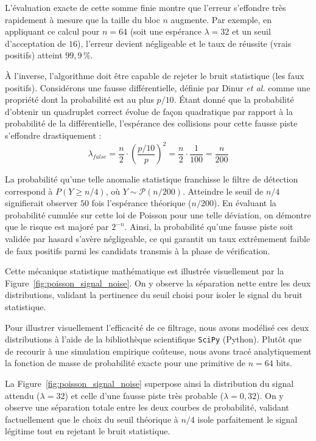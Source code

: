\documentclass[a4paper,11pt]{article}
\begin{document}
L'évaluation exacte de cette somme finie montre que l'erreur s'effondre très rapidement à mesure que la taille du bloc $n$ augmente. Par exemple, en appliquant ce calcul pour $n=64$ (soit une espérance $\lambda = 32$ et un seuil d'acceptation de $16$), l'erreur devient négligeable et le taux de réussite (vrais positifs) atteint $99,9\,\%$. 

À l'inverse, l'algorithme doit être capable de rejeter le bruit statistique (les faux positifs). Considérons une fausse différentielle, définie par Dinur \textit{et al.} \cite{DDKRS23} comme une propriété dont la probabilité est au plus $p/10$. Étant donné que la probabilité d'obtenir un quadruplet correct évolue de façon quadratique par rapport à la probabilité de la différentielle, l'espérance des collisions pour cette fausse piste s'effondre drastiquement :
\begin{equation*}
    \lambda_{false} = \frac{n}{2} \cdot \left(\frac{p/10}{p}\right)^2 = \frac{n}{2} \cdot \frac{1}{100} = \frac{n}{200}
\end{equation*}

La probabilité qu'une telle anomalie statistique franchisse le filtre de détection correspond à $P(Y \ge n/4)$, où $Y \sim \mathcal{P}(n/200)$. Atteindre le seuil de $n/4$ signifierait observer $50$ fois l'espérance théorique ($n/200$). En évaluant la probabilité cumulée sur cette loi de Poisson pour une telle déviation, on démontre que le risque est majoré par $2^{-n}$. Ainsi, la probabilité qu'une fausse piste soit validée par hasard s'avère négligeable, ce qui garantit un taux extrêmement faible de faux positifs parmi les candidats transmis à la phase de vérification.

Cette mécanique statistique mathématique est illustrée visuellement par la Figure~\ref{fig:poisson_signal_noise}. On y observe la séparation nette entre les deux distributions, validant la pertinence du seuil choisi pour isoler le signal du bruit statistique.

Pour illustrer visuellement l'efficacité de ce filtrage, nous avons modélisé ces deux distributions à l'aide de la bibliothèque scientifique \texttt{SciPy} (Python). Plutôt que de recourir à une simulation empirique coûteuse, nous avons tracé analytiquement la fonction de masse de probabilité exacte pour une primitive de $n=64$ bits. 

La Figure~\ref{fig:poisson_signal_noise} superpose ainsi la distribution du signal attendu ($\lambda = 32$) et celle d'une fausse piste très probable ($\lambda = 0,32$). On y observe une séparation totale entre les deux courbes de probabilité, validant factuellement que le choix du seuil théorique à $n/4$ isole parfaitement le signal légitime tout en rejetant le bruit statistique.
\end{document}
